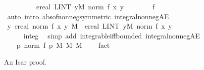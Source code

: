 \documentclass{article}
\theoremstyle{definition}
\begin{document}
\begin{figure}
\begin{isabellebody}
\ \ \ \ \isamarkupfalse%
\ \isamarkupfalse%
\ {\isachardoublequoteopen}{\isasymdots}\ {\isacharequal}\ ereal\ {\isasymbar}LINT\ y{\isacharbar}M{}{\isachardot}\ norm\ {\isacharparenleft}f\ {\isacharparenleft}x{\isacharcomma}\ y{\isacharparenright}{\isacharparenright}{\isasymbar}{\isachardoublequoteclose}\isanewline
\ \ \ \ \ \ \isamarkupfalse%
\ f\ \isamarkupfalse%
\ {\isacharparenleft}auto\ intro{\isacharbang}{\isacharcolon}\ abs{\isacharunderscore}of{\isacharunderscore}nonneg{\isacharbrackleft}symmetric{\isacharbrackright}\ integral{\isacharunderscore}nonneg{\isacharunderscore}AE{\isacharparenright}\isanewline
\ \ \ \ \isamarkupfalse%
\ \isamarkupfalse%
\ {\isachardoublequoteopen}{\isacharparenleft}{\isasymintegral}\isactrlsup {\isacharplus}y{\isachardot}\ ereal\ {\isacharparenleft}norm\ {\isacharparenleft}f\ {\isacharparenleft}x{\isacharcomma}\ y{\isacharparenright}{\isacharparenright}{\isacharparenright}\ {\isasympartial}M{}{\isacharparenright}\ {\isacharequal}\ ereal\ {\isasymbar}LINT\ y{\isacharbar}M{}{\isachardot}\ norm\ {\isacharparenleft}f\ {\isacharparenleft}x{\isacharcomma}\ y{\isacharparenright}{\isacharparenright}{\isasymbar}{\isachardoublequoteclose}\ \isacommand{{\isachardot}}\isamarkupfalse%
\isanewline
\ \ \isamarkupfalse%
\isanewline
\ \ \isamarkupfalse%
\ \isamarkupfalse%
\ {\isachardoublequoteopen}{\isasymdots}\ {\isacharless}\ {\isasyminfinity}{\isachardoublequoteclose}\isanewline
\ \ \ \ \isamarkupfalse%
\ integ{}\ \isamarkupfalse%
\ {\isacharparenleft}simp\ add{\isacharcolon}\ integrable{\isacharunderscore}iff{\isacharunderscore}bounded\ integral{\isacharunderscore}nonneg{\isacharunderscore}AE{\isacharparenright}\isanewline
\ \ \isamarkupfalse%
\ \isamarkupfalse%
\ {\isachardoublequoteopen}{\isacharparenleft}{\isasymintegral}\isactrlsup {\isacharplus}\ p{\isachardot}\ norm\ {\isacharparenleft}f\ p{\isacharparenright}\ {\isasympartial}{\isacharparenleft}M{}\ {\isasymOtimes}\isactrlsub M\ M{}{\isacharparenright}{\isacharparenright}\ {\isacharless}\ {\isasyminfinity}{\isachardoublequoteclose}\ \isacommand{{\isachardot}}\isamarkupfalse%
\isanewline
{}\isamarkupfalse%
\ fact%
\end{isabellebody}
\caption{An Isar proof.}
\label{fig:isar}
\end{figure}
\end{document}
